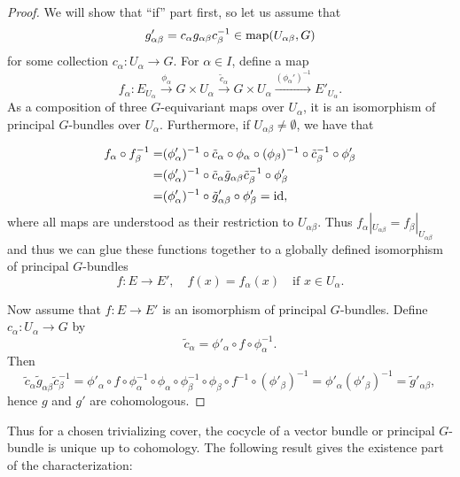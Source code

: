 \documentclass[a4paper,openany]{scrbook}
\begin{document}
\begin{proof}
We will show that ``if'' part first, so let us assume that
\[
g'_{\alpha\beta} = c_\alpha g_{\alpha\beta} c_\beta^{-1} \in \operatorname{map}(U_{\alpha\beta},G)
\]
for some collection $c_\alpha\colon U_\alpha \to G$. For $\alpha \in I$, define a map
\[
f_\alpha\colon E_{U_\alpha} \xrightarrow{\phi_\alpha} G \times U_\alpha \xrightarrow{\tilde c_\alpha} G \times U_\alpha \xrightarrow{(\phi_\alpha')^{-1}} E'_{U_\alpha}.
\]
As a composition of three $G$-equivariant maps over $U_\alpha$, it is an isomorphism of principal $G$-bundles over $U_\alpha$. Furthermore, if $U_{\alpha\beta} \neq \emptyset$, we have that

\begin{align*}
f_\alpha \circ f_\beta^{-1} =& (\phi'_\alpha)^{-1} \circ \tilde c_\alpha \circ \phi_{\alpha} \circ (\phi_{\beta})^{-1} \circ \tilde c_\beta^{-1} \circ \phi'_\beta\\
=& (\phi'_\alpha)^{-1} \circ \tilde c_\alpha \tilde g_{\alpha\beta}\tilde c_{\beta}^{-1} \circ \phi'_\beta\\
= & (\phi'_\alpha)^{-1} \circ \tilde g'_{\alpha\beta} \circ \phi'_\beta = \operatorname{id},
\end{align*}
where all maps are understood as their restriction to $U_{\alpha\beta}$. Thus $f_\alpha|_{U_{\alpha\beta}} = f_\beta|_{U_{\alpha\beta}}$ and thus we can glue these functions together to a globally defined isomorphism of principal $G$-bundles
\[
f\colon E \to E', \quad f(x) = f_\alpha(x) \quad \text{if } x \in U_\alpha.
\]

Now assume that $f\colon E \to E'$ is an isomorphism of principal $G$-bundles. Define $c_\alpha\colon U_\alpha \to G$ by 
\[
\tilde c_\alpha = \phi'_\alpha \circ f \circ \phi_\alpha^{-1}.
\]
Then
\[
\tilde c_\alpha \tilde g_{\alpha\beta} \tilde c_\beta^{-1} = \phi'_\alpha \circ f \circ \phi_\alpha^{-1} \circ \phi_\alpha \circ \phi_\beta^{-1} \circ \phi_\beta \circ f^{-1} \circ (\phi'_\beta)^{-1} =  \phi'_\alpha (\phi'_{\beta})^{-1} = \tilde g'_{\alpha\beta},
\]
hence $g$ and $g'$ are cohomologous.
\end{proof}

Thus for a chosen trivializing cover, the cocycle of a vector bundle or principal $G$-bundle is unique up to cohomology. The following result gives the existence part of the characterization:
\end{document}
